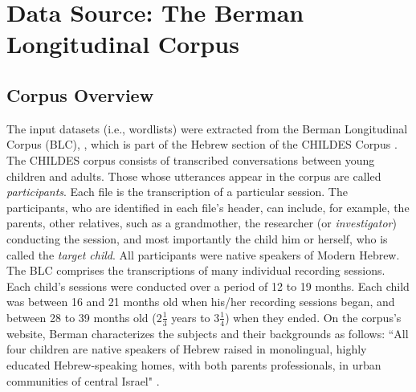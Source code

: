 \section{Data Source: The Berman Longitudinal Corpus}

\subsection{Corpus Overview}
The input datasets (i.e., wordlists) were extracted from the Berman Longitudinal Corpus (BLC),
\citep{berman-weissenborn:1991},
which is part of the Hebrew section of the CHILDES Corpus \citep{macwhinney:2000a}. 
The CHILDES corpus consists of transcribed 
conversations between young children and adults. Those whose utterances appear in the corpus are
called \emph{participants}. Each file is the transcription of a particular session. 
The participants, who are identified in each file's
header, can include, for example, the parents,
 other relatives, such as a grandmother, 
the researcher (or \emph{investigator}) conducting the session, and most importantly the child him or herself, who is called
the \emph{target child}. All participants were native speakers of Modern Hebrew. %
The BLC comprises the transcriptions of many individual recording sessions. Each child's sessions 
were conducted over a period of 12 to 19 months.
Each child was between 16 and 21 months old when his/her 
recording sessions began, and between 28 to 39 months old ($2\frac{1}{3}$ years to $3\frac{1}{4}$) when they ended.
On the corpus's website, Berman characterizes the subjects and their backgrounds as follows: ``All four children are native speakers of Hebrew raised in monolingual, highly educated Hebrew-speaking homes, with both parents professionals, in urban communities of central Israel" \citep{berman-long-web}.

